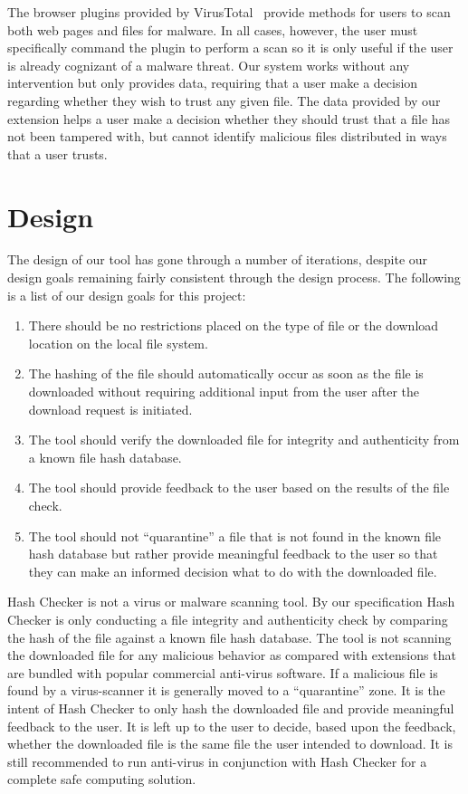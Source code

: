 \documentclass[letterpaper,twocolumn,10pt]{article}
\begin{document}
The browser plugins provided by VirusTotal~\cite{vtzilla,vtchromizer,vtexplorer} provide
methods for users to scan both web pages and files for malware. In all cases, however, the
user must specifically command the plugin to perform a scan so it is only useful if the user
is already cognizant of a malware threat. Our system works without any intervention
but only provides data, requiring that a user make a decision regarding whether they wish
to trust any given file. The data provided by our extension helps a user make a decision
whether they should trust that a file has not been tampered with, but cannot identify
malicious files distributed in ways that a user trusts.

\section{Design}

The design of our tool has gone through a number of iterations, despite our design goals remaining fairly consistent through the design process. The following is a list of our design goals for this project:

\begin{enumerate}
\item There should be no restrictions placed on the type of file or the download location on the local file system.
\item The hashing of the file should automatically occur as soon as the file is downloaded without requiring additional input from the user after the download request is initiated.
\item The tool should verify the downloaded file for integrity and authenticity from a known file hash database.
\item The tool should provide feedback to the user based on the results of the file check.
\item The tool should not “quarantine” a file that is not found in the known file hash database but rather provide meaningful feedback to the user so that they can make an informed decision what to do with the downloaded file.
\end{enumerate}

Hash Checker is not a virus or malware scanning tool. By our specification Hash Checker is only conducting a file integrity and authenticity check by comparing the hash of the file against a known file hash database. The tool is not scanning the downloaded file for any malicious behavior as compared with extensions that are bundled with popular commercial anti-virus software. If a malicious file is found by a virus-scanner it is generally moved to a “quarantine” zone. It is the intent of Hash Checker to only hash the downloaded file and provide meaningful feedback to the user. It is left up to the user to decide, based upon the feedback, whether the downloaded file is the same file the user intended to download. It is still recommended to run anti-virus in conjunction with Hash Checker for a complete safe computing solution.
\end{document}
